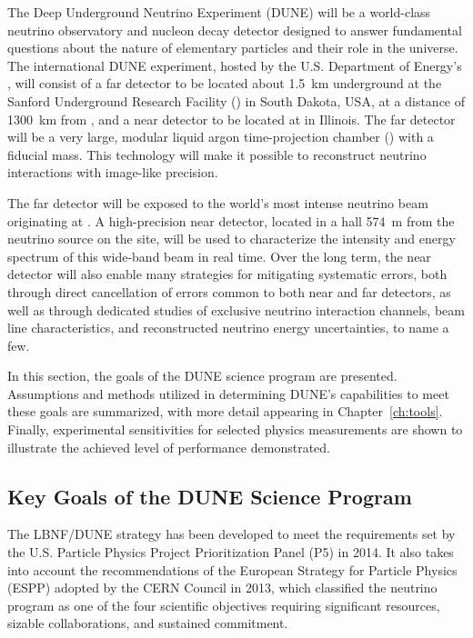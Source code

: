 The Deep Underground Neutrino Experiment (DUNE) will be a
world-class neutrino observatory and nucleon decay detector
designed to answer
fundamental questions about the nature of elementary particles
and their role in the universe. The international DUNE
experiment, hosted by the U.S. Department of Energy's \fnal{},
will consist of a far detector to be located about \SI{1.5}{km}
underground at the Sanford Underground Research Facility
(\surf) in South Dakota, USA, at a distance of  \SI{1300}{\km}
from \fnal{}, and a near detector to be located at \fnal in
Illinois. The far detector will be a very large, modular
liquid argon time-projection chamber (\lartpc) with a
\fdfiducialmass fiducial mass. This \lar technology will make
it possible to reconstruct neutrino interactions
with image-like precision.

The far detector will be exposed to the world's most intense 
neutrino beam originating at \fnal{}. A high-precision near 
detector, located in a hall \SI{574}{m} from the neutrino source on 
the \fnal site, will be used to characterize
the intensity and energy spectrum of this wide-band 
beam in real time.  Over the long term, the near detector 
will also enable many strategies for mitigating systematic 
errors, both through direct cancellation of errors common to both near and far detectors, as well as through dedicated studies
of exclusive neutrino interaction channels, beam line characteristics, 
and reconstructed neutrino energy uncertainties, to name a few.

In this section, the goals of the DUNE science program are
presented.  Assumptions and methods utilized in determining
DUNE's capabilities to meet these goals are summarized,
with more detail appearing in Chapter~\ref{ch:tools}.
Finally, experimental sensitivities for selected
physics measurements are shown to illustrate the achieved level of 
performance demonstrated.

\subsection{Key Goals of the DUNE Science Program}
\label{sec:exec-key-goals}

The LBNF/DUNE strategy has been developed to meet the
requirements set by the U.S. Particle Physics Project Prioritization Panel
(P5) in 2014. It also takes into account the recommendations
of the European Strategy for Particle Physics (ESPP) adopted
by the CERN Council in 2013, which classified the 
neutrino program as one of the four scientific objectives requiring significant resources, sizable collaborations, and sustained commitment.  

